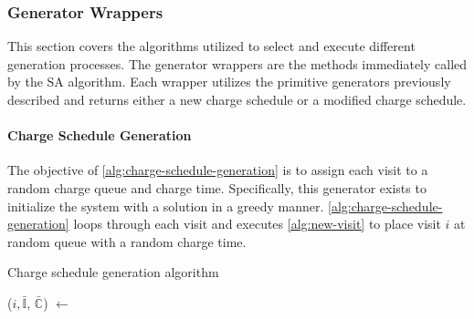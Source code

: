 \documentclass[ee,thesis]{usuthesis}
\newcommand{\I}{\mathbb{I}}                 %
\newcommand{\C}{\mathbb{C}}                 %
\newcommand{\Sol}{\mathbb{S}}               %
\begin{document}
\subsubsection{Generator Wrappers}
\label{sec:generator-wrappers}
This section covers the algorithms utilized to select and execute different generation processes. The generator wrappers
are the methods immediately called by the SA algorithm. Each wrapper utilizes the primitive generators previously
described and returns either a new charge schedule or a modified charge schedule.

\paragraph{Charge Schedule Generation}
\label{sec:charge-schedule-generation}
The objective of \ref{alg:charge-schedule-generation} is to assign each visit to a random charge queue and charge time.
Specifically, this generator exists to initialize the system with a solution in a greedy manner.
\ref{alg:charge-schedule-generation} loops through each visit and executes \ref{alg:new-visit} to place visit \(i\) at
random queue with a random charge time.

\begin{algorithm}[H]
\scriptsize
\caption{Charge schedule generation algorithm} \label{alg:charge-schedule-generation}
    \LinesNumbered
    \KwIn{$\Sol$}
    \KwOut{$\bar{\Sol}$}


    \Begin
    {
        \ForEach {$\I_i \in \I$}
        {
            ($i, \bar{\I}$, $\bar{\C}$) $\leftarrow$ \NewVisit{($\I_i$, $\I$, $\C$)}
        }
            \Return{($0, \bar{\I}$, $\bar{\C}$)}
    }
  \end{algorithm}
\end{document}
